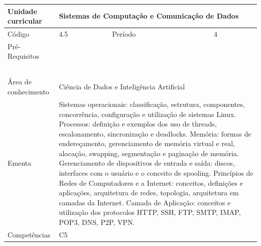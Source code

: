 \clearpage
\newpage

\begin{quadro}[ht!]
  \centering\scriptsize
\caption{Unidade Curricular Sistemas de Computação e Comunicação de Dados}

\begin{tabular}{|p{2.5cm}|p{2.5cm}|p{2.5cm}|p{2.5cm}|p{2.5cm}|}\hline

  Unidade curricular & \multicolumn{4}{p{10cm}|}{ Sistemas de Computação e Comunicação de Dados }\\\hline
  Código & 4.5 & Período & \multicolumn{2}{p{5cm}|}{ 4 }\\\hline
  Pré-Requisitos & \multicolumn{4}{p{10cm}|}{  } \\\hline
  \cellcolor{blue1}{ CH PRESENCIAL } &
    \cellcolor{blue1}{CH EAD Síncrona} &
    \cellcolor{blue1}{CH EAD Síncrona Mediada} &
    \cellcolor{blue1}{CH EAD Assíncrona} &
    \cellcolor{blue1}{CH APCC} \\\hline
  \cellcolor{blue1}{ 30 } &
    \cellcolor{blue1}{ 0 } &
    \cellcolor{blue1}{ 0 } &
    \cellcolor{blue1}{ 30 } &
    \cellcolor{blue1}{0} \\\hline
  \cellcolor{blue1}{ CH Teórica } &
    \cellcolor{blue1}{CH Prática} &
    \cellcolor{blue1}{CH Humanidades} &
    \cellcolor{blue1}{CH Extensão} &
    \cellcolor{blue1}{CH EAD TOTAL} \\\hline
  \cellcolor{blue1}{ 30 } &
    \cellcolor{blue1}{ 30 } &
    \cellcolor{blue1}{ 0 } &
    \cellcolor{blue1}{ 0 } &
    \cellcolor{blue1}{ 30 } \\\hline
  \cellcolor{blue1}{CARGA-HORÁRIA TOTAL} & \multicolumn{4}{p{10cm}|}{ \cellcolor{blue1}{ 60 } } \\\hline
  Área de conhecimento & \multicolumn{4}{p{10cm}|}{ Ciência de Dados e Inteligência Artificial } \\\hline
  Ementa & \multicolumn{4}{p{10cm}|}{ Sistemas operacionais: classificação, estrutura, componentes, concorrência, configuração e utilização de sistemas Linux. Processos: definição e exemplos dos uso de threads, escalonamento, sincronização e deadlocks. Memória: formas de endereçamento, gerenciamento de memória virtual e real, alocação, swapping, segmentação e paginação de memória. Gerenciamento de dispositivos de entrada e saída: discos, interfaces com o usuário e o conceito de spooling. Princípios de Redes de Computadores e a Internet: conceitos, definições e aplicações, arquitetura de redes, topologia, arquitetura em camadas da Internet. Camada de Aplicação: conceitos e utilização dos protocolos HTTP, SSH, FTP, SMTP, IMAP, POP3, DNS, P2P, VPN. } \\\hline
  Competências & \multicolumn{4}{p{10cm}|}{ C5 } \\\hline


  
	\end{tabular}

\end{quadro}


